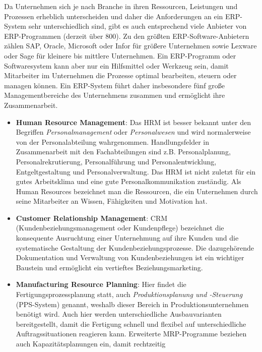 \documentclass[a4paper, 12pt]{report}
\begin{document}
Da Unternehmen sich je nach Branche in ihren Ressourcen, Leistungen und 
Prozessen erheblich unterscheiden und daher die Anforderungen an ein ERP-System 
sehr unterschiedlich sind, gibt es auch entsprechend viele Anbieter von 
ERP-Programmen (derzeit über 800). Zu den größten ERP-Software-Anbietern zählen
SAP, Oracle, Microsoft oder Infor für größere Unternehmen sowie Lexware oder 
Sage für kleinere bis mittlere Unternehmen. Ein ERP-Programm oder Softwaresystem
kann aber nur ein Hilfsmittel oder Werkzeug sein, damit Mitarbeiter im 
Unternehmen die Prozesse optimal bearbeiten, steuern oder managen können. Ein 
ERP-System führt daher insbesondere fünf große Managementbereiche des 
Unternehmens zusammen und ermöglicht ihre Zusammenarbeit.

\newpage
\begin{itemize}
    \item \textbf{Human Resource Management}: Das HRM ist besser bekannt unter 
        den Begriffen \emph{Personalmanagement} oder \emph{Personalwesen} und 
        wird normalerweise von der Personalabteilung wahrgenommen. 
        Handlungsfelder in Zusammenarbeit mit den Fachabteilungen sind z.B. 
        Personalplanung, Personalrekrutierung, Personalführung und 
        Personalentwicklung, Entgeltgestaltung und Personalverwaltung. Das HRM 
        ist nicht zuletzt für ein gutes Arbeitsklima und eine gute 
        Personalkommunikation zuständig. Als Human Resources bezeichnet man die 
        Ressourcen, die ein Unternehmen durch seine Mitarbeiter an Wissen, 
        Fähigkeiten und Motivation hat. 
    \item \textbf{Customer Relationship Management}: CRM 
        (Kundenbeziehungsmanagement oder Kundenpflege) bezeichnet die 
        konsequente Ausruchtung einer Unternehmung auf ihre Kunden und die 
        systematische Gestaltung der Kundenbeziehungsprozesse. Die dazugehörende 
        Dokumentation und Verwaltung von Kundenbeziehungen ist ein wichtiger 
        Baustein und ermöglicht ein vertieftes Beziehungsmarketing. 
    \item \textbf{Manufacturing Resource Planning}: Hier findet die 
        Fertigungsprozessplanung statt, auch \emph{Produktionsplanung und 
        -Steuerung} (PPS-System) genannt, weshalb dieser Bereich in 
        Produktionsunternehmen benötigt wird. Auch hier werden unterschiedliche 
        Ausbauvarianten bereitgestellt, damit die Fertigung schnell und flexibel
        auf unterschiedliche Auftragssituationen reagieren kann. Erweiterte 
        MRP-Programme beziehen auch Kapazitätsplanungen ein, damit rechtzeitig 

\end{itemize}
\end{document}
